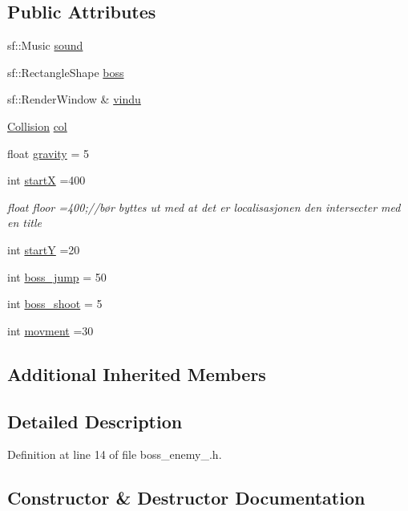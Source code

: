 \subsection*{Public Attributes}
\begin{DoxyCompactItemize}
\item 
sf\+::\+Music \hyperlink{classboss__enemy__2_a46f313cdeff7cbfe637e3b4f6600cc68}{sound}
\item 
sf\+::\+Rectangle\+Shape \hyperlink{classboss__enemy__2_a1ffee874c7083f8bcdb2b66bef56daa2}{boss}
\item 
sf\+::\+Render\+Window \& \hyperlink{classboss__enemy__2_a009ce9fc4bc3da63a2380221f38df441}{vindu}
\item 
\hyperlink{class_collision}{Collision} \hyperlink{classboss__enemy__2_a59f86459a90bbd1ad535889e9197cb6f}{col}
\item 
float \hyperlink{classboss__enemy__2_a8abff95ac6b01b5d6b38f93f1c4060f7}{gravity} = 5
\item 
int \hyperlink{classboss__enemy__2_aabc3601b0121203650e78430aab3b309}{startX} =400
\begin{DoxyCompactList}\small\item\em float floor =400;//bør byttes ut med at det er localisasjonen den intersecter med en title \end{DoxyCompactList}\item 
int \hyperlink{classboss__enemy__2_a6e3d39e8276440d0b4b897aecc63839c}{startY} =20
\item 
int \hyperlink{classboss__enemy__2_a838ab901aab6f1e202d924dfc32dc420}{boss\+\_\+jump} = 50
\item 
int \hyperlink{classboss__enemy__2_ad07f609155076e0ee1fd0dcb015e05d0}{boss\+\_\+shoot} = 5
\item 
int \hyperlink{classboss__enemy__2_acda97e45d43d96c23c03f7aedaf0d537}{movment} =30
\end{DoxyCompactItemize}
\subsection*{Additional Inherited Members}


\subsection{Detailed Description}


Definition at line 14 of file boss\+\_\+enemy\+\_.\+h.



\subsection{Constructor \& Destructor Documentation}
\hypertarget{classboss__enemy__2_a5090ddbdea5fedbd070705079b053c14}{}\label{classboss__enemy__2_a5090ddbdea5fedbd070705079b053c14} 
